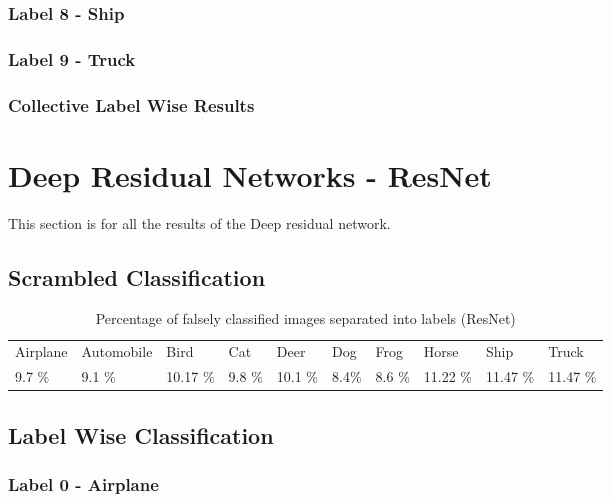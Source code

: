 \subsubsection{Label 8 - Ship}
\FloatBarrier
\subsubsection{Label 9 - Truck}
\FloatBarrier
\subsubsection{Collective Label Wise Results}
\FloatBarrier

\section{Deep Residual Networks - ResNet}
This section is for all the results of the Deep residual network.
\subsection{Scrambled Classification}
\FloatBarrier

\begin{table}[]
	\centering
	\caption{Percentage of falsely classified images separated into labels (ResNet)}
	\label{table:falseclasRes}
	\begin{tabular}{llllllllll}
		Airplane & Automobile & Bird     & Cat    & Deer     & Dog     & Frog   & Horse    & Ship         & Truck         \\
		9.7 \%  & 9.1 \%    & 10.17 \% & 9.8 \% & 10.1 \% & 8.4\% & 8.6 \% & 11.22 \% & 11.47 \% & 11.47 \%
	\end{tabular}
\end{table}
\FloatBarrier
\subsection{Label Wise Classification}
\subsubsection{Label 0 - Airplane}
\FloatBarrier
